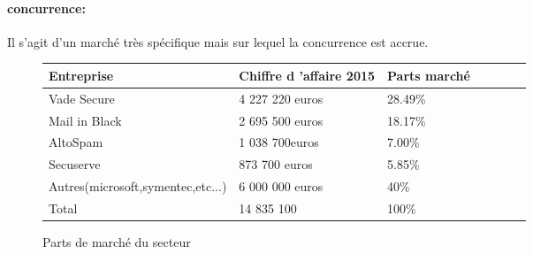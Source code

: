 \paragraph{concurrence:}
Il s’agit d’un marché très spécifique mais sur lequel la concurrence est accrue.\\

\begin{figure}[!h]
\begin{center}
\begin{tabular}{|l|l|l|l|c|l|l|}
  \hline
 Entreprise & Chiffre d 'affaire 2015& Parts marché\\
  \hline
   Vade Secure& 4 227 220 euros & 28.49\% \\
   \hline
  Mail in Black& 2 695 500 euros & 18.17\% \\
  \hline
  AltoSpam& 1 038 700euros & 7.00\% \\
  \hline  
   \rowcolor{orange}Secuserve& 873 700 euros& 5.85\% \\
	\hline
   Autres(microsoft,symentec,etc...)& 6 000 000 euros & 40\%\\
	\hline  
    Total& 14 835 100 & 100\% \\
  \hline
\end{tabular}
\end{center}
\caption{Parts de marché du secteur}
\end{figure}

